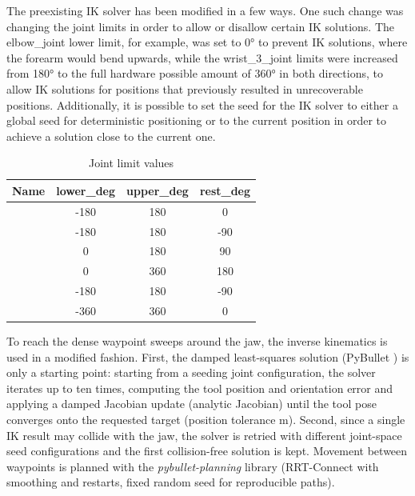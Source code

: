 The preexisting IK solver has been modified in a few ways. One such change was changing the joint limits in order to allow or disallow certain IK solutions. The elbow\_joint lower limit, for example,
was set to 0° to prevent IK solutions, where the forearm would bend upwards, while the wrist\_3\_joint limits were increased from 180° to the full hardware possible amount of 360° in both directions, to allow IK solutions for positions that previously resulted in unrecoverable positions. Additionally, it is possible to set the seed for the IK solver to either a global seed for deterministic positioning or to the current position in order to achieve a solution close to the current one.
\begin{table}[!htbp]
    \centering
    \small
    \caption{Joint limit values}
    \begin{tabular}{@{}>{\raggedright\arraybackslash}p{}
                    S[table-format=-3.0] S[table-format=-3.0] S[table-format=-3.0]@{}}
        \toprule
        \textbf{Name} & \textbf{lower\_deg} & \textbf{upper\_deg} & \textbf{rest\_deg} \\
        \midrule
          & -180 & 180 &  0 \\
         & -180 & 180 & -90 \\
                 &    0 & 180 & 90 \\
               &    0 & 360 & 180 \\
               & -180 & 180 & -90 \\
               & -360 & 360 &  0 \\
        \bottomrule
    \end{tabular}
    \label{tab:ms-joint-limits}
\end{table}
To reach the dense waypoint sweeps around the jaw, the inverse kinematics is used in a modified fashion. First, the damped least-squares solution (PyBullet
) is only a starting point: starting from a seeding joint configuration, the solver iterates up to ten times, computing the tool position
and orientation error and applying a damped Jacobian update (analytic Jacobian) until the tool pose converges onto the requested target (position
tolerance  m). Second, since a single IK result may collide with the jaw, the solver is retried with different joint-space seed
configurations and the first collision-free solution is kept. Movement between waypoints is planned with the \emph{pybullet-planning} library
\cite{garrett2018pybulletplanning} (RRT-Connect with smoothing and restarts, fixed random seed for reproducible paths).

